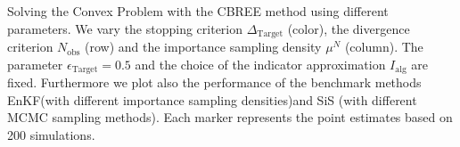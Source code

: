 Solving the Convex Problem with the CBREE method using  different parameters. We vary the stopping criterion $\Delta_{\text{Target}}$ (color), the divergence criterion $N_\text{obs}$ (row) and the importance sampling density $\mu^N$ (column). The parameter $\epsilon_{\text{Target}} = 0.5$ and the choice of the indicator approximation $I_\text{alg}$ are fixed. Furthermore we plot also the performance of the benchmark methods EnKF(with different importance sampling densities)and SiS (with different MCMC sampling methods). Each marker represents the point estimates based on 200 simulations.